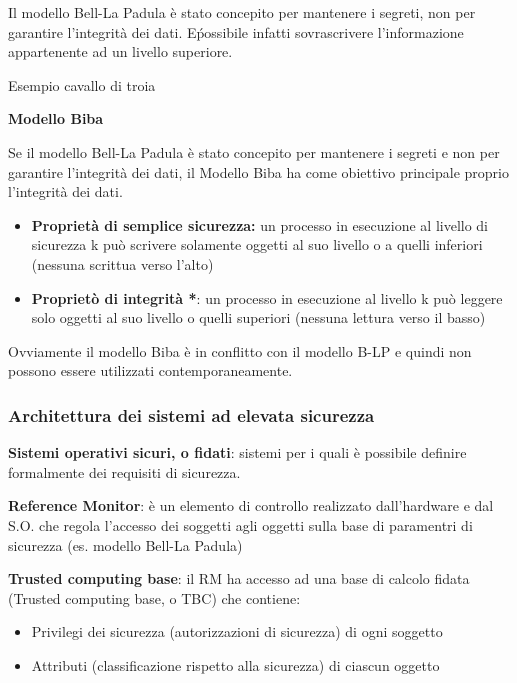\documentclass{article}
\begin{document}
\vspace{3mm}
Il modello Bell-La Padula è stato concepito per mantenere i segreti, non per garantire l'integrità dei dati. E\' possibile infatti sovrascrivere l'informazione
appartenente ad un livello superiore.

\vspace{3mm}
Esempio cavallo di troia

\vspace{3mm}
\textbf{Modello Biba}
\vspace{3mm}

Se il modello Bell-La Padula è stato concepito per mantenere i segreti e non per garantire l'integrità dei dati, il Modello Biba ha come obiettivo principale proprio
l'integrità dei dati.

\vspace{3mm}
\begin{itemize}
    \item \textbf{Proprietà di semplice sicurezza:} un processo in esecuzione al livello di sicurezza k può scrivere solamente oggetti al suo livello o a quelli
    inferiori (nessuna scrittua verso l'alto)
    \item \textbf{Proprietò di integrità *}: un processo in esecuzione al livello k può leggere solo oggetti al suo livello o quelli superiori (nessuna lettura
    verso il basso)
\end{itemize}

Ovviamente il modello Biba è in conflitto con il modello B-LP e quindi non possono essere utilizzati contemporaneamente.

\subsubsection{Architettura dei sistemi ad elevata sicurezza}

\textbf{Sistemi operativi sicuri, o fidati}: sistemi per i quali è possibile definire formalmente dei requisiti di sicurezza.

\vspace{3mm}
\textbf{Reference Monitor}: è un elemento di controllo realizzato dall'hardware e dal S.O. che regola l'accesso dei soggetti agli oggetti sulla base di paramentri
di sicurezza (es. modello Bell-La Padula)

\vspace{3mm}
\textbf{Trusted computing base}: il RM ha accesso ad una base di calcolo fidata (Trusted computing base, o TBC) che contiene:
\begin{itemize}
    \item Privilegi dei sicurezza (autorizzazioni di sicurezza) di ogni soggetto
    \item Attributi (classificazione rispetto alla sicurezza) di ciascun oggetto
\end{itemize}
\end{document}
